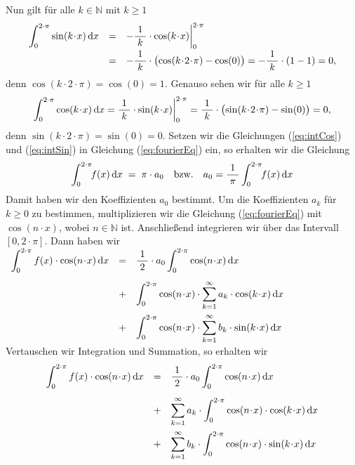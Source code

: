 Nun gilt f\"ur alle $k\in\mathbb{N}$ mit $k\geq 1$
\begin{equation}
  \label{eq:intSin}
  \begin{array}[t]{lcl}    
  \displaystyle \int_0^{2\cdot\pi} \sin(k\!\cdot\!x)\,\dr x & = &
 -\bruch{1}{k}\cdot\cos(k\!\cdot\!x) \bigg|_0^{2\cdot\pi} \\[0.3cm]
& = &
 -\bruch{1}{k}\cdot\bigl(\cos(k\!\cdot\!2\!\cdot\!\pi) - \cos(0)\bigr) = 
 -\bruch{1}{k}\cdot(1 - 1) = 0,
  \end{array}
\end{equation}
denn $\cos(k\!\cdot\!2\!\cdot\!\pi) = \cos(0) = 1$. Genauso sehen wir f\"ur alle $k\geq 1$
\begin{equation}
  \label{eq:intCos}
  \int_0^{2\cdot\pi} \cos(k\!\cdot\!x)\,\dr x = 
 \bruch{1}{k}\cdot\sin(k\!\cdot\!x) \bigg|_0^{2\cdot\pi} = 
 \bruch{1}{k}\cdot\bigl(\sin(k\!\cdot\!2\!\cdot\!\pi) - \sin(0)\bigr) = 0,
\end{equation}
denn $\sin(k\!\cdot\!2\!\cdot\!\pi) = \sin(0) = 0$.
Setzen wir die Gleichungen (\ref{eq:intCos}) und (\ref{eq:intSin}) in Gleichung
(\ref{eq:fourierEq}) ein, so erhalten wir die Gleichung
\begin{equation}
  \label{eq:fourierA0}
\int_0^{2\cdot\pi}\!\!f(x)\,\textrm{d} x \; = \; \pi\cdot a_0 \quad \mbox{bzw.}\quad a_0 = \displaystyle\frac{\;\displaystyle1\;}{\;\displaystyle\pi\;}\int_0^{2\cdot\pi}\!\!f(x)\,\textrm{d} x
\end{equation}
Damit haben wir  den Koeffizienten $a_0$ bestimmt.  Um die Koeffizienten 
$a_k$ f\"ur $k\geq 0$ zu bestimmen, 
multiplizieren wir die Gleichung (\ref{eq:fourierEq}) mit $\cos(n\!\cdot\!x)$, wobei
$n\in\mathbb{N}$ ist.  Anschlie{\ss}end integrieren wir  \"uber das
Intervall $[0,2\!\cdot\!\pi]$.  Dann haben wir
\\[0.3cm]
\hspace*{0.8cm}
$
\begin{array}[t]{lcl}
\displaystyle \int_0^{2\cdot\pi}f(x)\cdot\cos(n\!\cdot\!x)\,\dr x 
& = & \displaystyle \bruch{1}{2}\cdot a_0  \int_0^{2\cdot\pi} \cos(n\!\cdot\!x)\,\dr x  \\[0.5cm]
& + & \displaystyle \int_0^{2\cdot\pi} \cos(n\!\cdot\!x)\cdot\sum\limits_{k=1}^\infty a_k\cdot \cos(k\!\cdot\!x) \,\dr x \\[0.5cm]
& + & \displaystyle \int_0^{2\cdot\pi} \cos(n\!\cdot\!x)\cdot\sum\limits_{k=1}^\infty b_k\cdot \sin(k\!\cdot\!x) \,\dr x 
\end{array}
$
\\[0.3cm]
Vertauschen wir Integration und Summation, so erhalten wir
\begin{equation}
  \label{eq:fourierAk1}
\begin{array}[b]{lcl}
\displaystyle \int_0^{2\cdot\pi}f(x)\cdot\cos(n\!\cdot\!x)\,\dr x 
& = & \displaystyle \bruch{1}{2}\cdot a_0  \int_0^{2\cdot\pi} \cos(n\!\cdot\!x)\,\dr x  \\[0.5cm]
& + & \displaystyle \sum\limits_{k=1}^\infty a_k\cdot \int_0^{2\cdot\pi} \cos(n\!\cdot\!x)\cdot\cos(k\!\cdot\!x) \,\dr x \\[0.5cm]
& + & \displaystyle \sum\limits_{k=1}^\infty b_k\cdot \int_0^{2\cdot\pi} \cos(n\!\cdot\!x)\cdot\sin(k\!\cdot\!x) \,\dr x 
\end{array}  
\end{equation}
